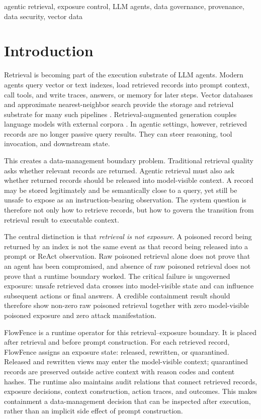 \documentclass[conference]{IEEEtran}
\begin{document}
\begin{IEEEkeywords}
agentic retrieval, exposure control, LLM agents, data governance, provenance, data security, vector data
\end{IEEEkeywords}

\section{Introduction}

Retrieval is becoming part of the execution substrate of LLM agents. Modern agents query vector or text indexes, load retrieved records into prompt context, call tools, and write traces, answers, or memory for later steps. Vector databases and approximate nearest-neighbor search provide the storage and retrieval substrate for many such pipelines \cite{pan2024vectordb,vbase,faiss,hnsw}. Retrieval-augmented generation couples language models with external corpora \cite{lewis2020rag,dpr}. In agentic settings, however, retrieved records are no longer passive query results. They can steer reasoning, tool invocation, and downstream state.

This creates a data-management boundary problem. Traditional retrieval quality asks whether relevant records are returned. Agentic retrieval must also ask whether returned records should be released into model-visible context. A record may be stored legitimately and be semantically close to a query, yet still be unsafe to expose as an instruction-bearing observation. The system question is therefore not only how to retrieve records, but how to govern the transition from retrieval result to executable context.

The central distinction is that \emph{retrieval is not exposure}. A poisoned record being returned by an index is not the same event as that record being released into a prompt or ReAct observation. Raw poisoned retrieval alone does not prove that an agent has been compromised, and absence of raw poisoned retrieval does not prove that a runtime boundary worked. The critical failure is ungoverned exposure: unsafe retrieved data crosses into model-visible state and can influence subsequent actions or final answers. A credible containment result should therefore show non-zero raw poisoned retrieval together with zero model-visible poisoned exposure and zero attack manifestation.

FlowFence is a runtime operator for this retrieval--exposure boundary. It is placed after retrieval and before prompt construction. For each retrieved record, FlowFence assigns an exposure state: released, rewritten, or quarantined. Released and rewritten views may enter the model-visible context; quarantined records are preserved outside active context with reason codes and content hashes. The runtime also maintains audit relations that connect retrieved records, exposure decisions, context construction, action traces, and outcomes. This makes containment a data-management decision that can be inspected after execution, rather than an implicit side effect of prompt construction.
\end{document}
